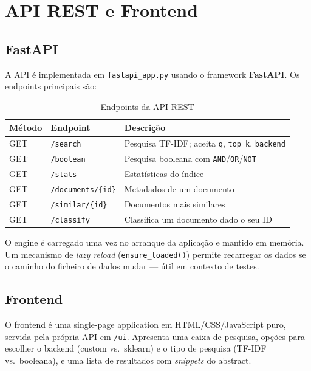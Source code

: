 \documentclass[12pt,a4paper]{article}
\begin{document}
\section{API REST e Frontend}

\subsection{FastAPI}

A API é implementada em \texttt{fastapi\_app.py} usando o framework \textbf{FastAPI}. Os endpoints principais são:

\begin{table}[H]
\centering
\caption{Endpoints da API REST}
\begin{tabular}{@{}lll@{}}
\toprule
\textbf{Método} & \textbf{Endpoint}       & \textbf{Descrição} \\
\midrule
GET  & \texttt{/search}            & Pesquisa TF-IDF; aceita \texttt{q}, \texttt{top\_k}, \texttt{backend} \\
GET  & \texttt{/boolean}           & Pesquisa booleana com \texttt{AND}/\texttt{OR}/\texttt{NOT} \\
GET  & \texttt{/stats}             & Estatísticas do índice \\
GET  & \texttt{/documents/\{id\}}  & Metadados de um documento \\
GET  & \texttt{/similar/\{id\}}    & Documentos mais similares \\
GET  & \texttt{/classify}          & Classifica um documento dado o seu ID \\
\bottomrule
\end{tabular}
\end{table}

O engine é carregado uma vez no arranque da aplicação e mantido em memória. Um mecanismo de \emph{lazy reload} (\texttt{ensure\_loaded()}) permite recarregar os dados se o caminho do ficheiro de dados mudar --- útil em contexto de testes.

\subsection{Frontend}

O frontend é uma single-page application em HTML/CSS/JavaScript puro, servida pela própria API em \texttt{/ui}. Apresenta uma caixa de pesquisa, opções para escolher o backend (custom vs.\ sklearn) e o tipo de pesquisa (TF-IDF vs.\ booleana), e uma lista de resultados com \emph{snippets} do abstract.
\end{document}
